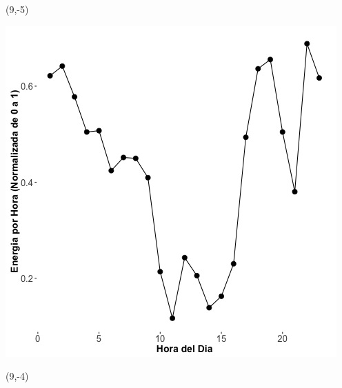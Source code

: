 \documentclass{article}\usepackage[]{graphicx}\usepackage[]{color}
\newenvironment{knitrout}{}{} %
\begin{document}
 \begin{textblock}{1}(9,-5)
\begin{minipage}{20em}
\begingroup

\endgroup
\end{minipage}
\end{textblock}

\begin{knitrout}
\color{fgcolor}
\includegraphics[scale=0.65]{figure/A18_plot_norm_median} 
\end{knitrout}


 \begin{textblock}{1}(9,-4)
\begin{minipage}{20em}
\begingroup

\endgroup
\end{minipage}
\end{textblock}
\end{document}
